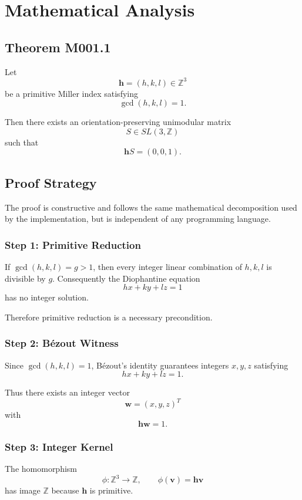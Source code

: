 
\section{Mathematical Analysis}

\subsection{Theorem M001.1}

Let
\[
\mathbf h=(h,k,l)\in\mathbb Z^3
\]
be a primitive Miller index satisfying
\[
\gcd(h,k,l)=1.
\]

Then there exists an orientation-preserving unimodular matrix
\[
S\in SL(3,\mathbb Z)
\]
such that
\[
\mathbf hS=(0,0,1).
\]

\subsection{Proof Strategy}

The proof is constructive and follows the same mathematical decomposition
used by the implementation, but is independent of any programming
language.

\subsubsection*{Step 1: Primitive Reduction}

If $\gcd(h,k,l)=g>1$, then every integer linear combination of
$h,k,l$ is divisible by $g$. Consequently the Diophantine equation
\[
hx+ky+lz=1
\]
has no integer solution.

Therefore primitive reduction is a necessary precondition.

\subsubsection*{Step 2: Bézout Witness}

Since $\gcd(h,k,l)=1$, Bézout's identity guarantees integers
$x,y,z$ satisfying
\[
hx+ky+lz=1.
\]

Thus there exists an integer vector
\[
\mathbf w=(x,y,z)^T
\]
with
\[
\mathbf h\mathbf w=1.
\]

\subsubsection*{Step 3: Integer Kernel}

The homomorphism
\[
\phi:\mathbb Z^3\rightarrow\mathbb Z,
\qquad
\phi(\mathbf v)=\mathbf h\mathbf v
\]
has image $\mathbb Z$ because $\mathbf h$ is primitive.

